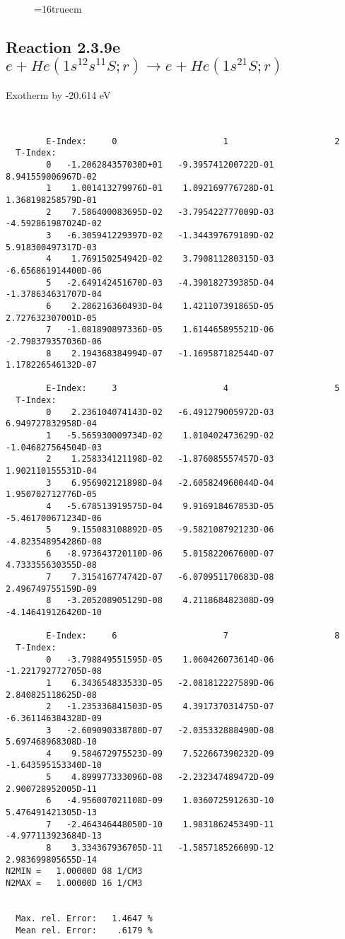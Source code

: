 \documentclass[12pt,dvipdfmx]{article}
\begin{document}
\begin{figure} \label{2.3.9d}
\epsfxsize=16truecm
\end{figure}
\newpage


\subsection{
Reaction 2.3.9e  $e + He(1s^12s^11S;r) \rightarrow e + He(1s^21S;r) $
}
Exotherm by -20.614 eV

\begin{small}\begin{verbatim}


        E-Index:     0                     1                     2
  T-Index:
        0   -1.206284357030D+01   -9.395741200722D-01    8.941559006967D-02
        1    1.001413279976D-01    1.092169776728D-01    1.368198258579D-01
        2    7.586400083695D-02   -3.795422777009D-03   -4.592861987024D-02
        3   -6.305941229397D-02   -1.344397679189D-02    5.918300497317D-03
        4    1.769150254942D-02    3.790811280315D-03   -6.656861914400D-06
        5   -2.649142451670D-03   -4.390182739385D-04   -1.378634631707D-04
        6    2.286216360493D-04    1.421107391865D-05    2.727632307001D-05
        7   -1.081890897336D-05    1.614465895521D-06   -2.798379357036D-06
        8    2.194368384994D-07   -1.169587182544D-07    1.178226546132D-07

        E-Index:     3                     4                     5
  T-Index:
        0    2.236104074143D-02   -6.491279005972D-03    6.949727832958D-04
        1   -5.565930009734D-02    1.010402473629D-02   -1.046827564504D-03
        2    1.258334121198D-02   -1.876085557457D-03    1.902110155531D-04
        3    6.956902121898D-04   -2.605824960044D-04    1.950702712776D-05
        4   -5.678513919575D-04    9.916918467853D-05   -5.461700671234D-06
        5    9.155083108892D-05   -9.582108792123D-06   -4.823548954286D-08
        6   -8.973643720110D-06    5.015822067600D-07    4.733355630355D-08
        7    7.315416774742D-07   -6.070951170683D-08    2.496749755159D-09
        8   -3.205208905129D-08    4.211868482308D-09   -4.146419126420D-10

        E-Index:     6                     7                     8
  T-Index:
        0   -3.798849551595D-05    1.060426073614D-06   -1.221792772705D-08
        1    6.343654833533D-05   -2.081812227589D-06    2.840825118625D-08
        2   -1.235336841503D-05    4.391737031475D-07   -6.361146384328D-09
        3   -2.609090338780D-07   -2.035332888490D-08    5.697468968308D-10
        4    9.584672975523D-09    7.522667390232D-09   -1.643595153340D-10
        5    4.899977333096D-08   -2.232347489472D-09    2.900728952005D-11
        6   -4.956007021108D-09    1.036072591263D-10    5.476491421305D-13
        7   -2.464346448050D-10    1.983186245349D-11   -4.977113923684D-13
        8    3.334367936705D-11   -1.585718526609D-12    2.983699805655D-14
N2MIN =   1.00000D 08 1/CM3
N2MAX =   1.00000D 16 1/CM3


  Max. rel. Error:   1.4647 %
  Mean rel. Error:    .6179 %


\end{verbatim}\end{small}
\end{document}
